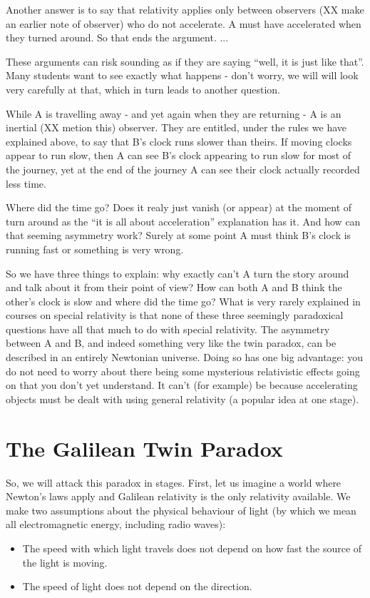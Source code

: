 \documentclass[a4paper]{report}
\begin{document}
Another answer is to say that relativity applies only between observers (XX make an earlier note of observer) who do not accelerate. A must have accelerated when they turned around. So that ends the argument. ...

These arguments can risk sounding as if they are saying ``well, it is just like that''. Many students want to see exactly what happens - don't worry, we will will look very carefully at that, which in turn leads to another question.

While A is travelling away - and yet again when they are returning - A is an inertial (XX metion this) observer. They are entitled, under the rules we have explained above, to say that B's clock runs slower than theirs. If moving clocks appear to run slow, then A can see B's clock appearing to run slow for most of the journey, yet at the end of the journey A can see their clock actually recorded less time.

Where did the time go? Does it realy just vanish (or appear) at the moment of turn around as the ``it is all about acceleration'' explanation has it.  And how can that seeming asymmetry work? Surely at some point A must think B's clock is running fast or something is very wrong.

So we have three things to explain: why exactly can't A turn the story around and talk about it from their point of view? How can both A and B think the other's clock is slow and where did the time go? What is very rarely explained in courses on special relativity is that none of these three seemingly paradoxical questions have all that much to do with special relativity. The asymmetry between A and B, and indeed something very like the twin paradox, can be described in an entirely Newtonian universe. Doing so has one big advantage: you do not need to worry about there being some mysterious relativistic effects going on that you don't yet understand. It can't (for example) be because accelerating objects must be dealt with using general relativity (a popular idea at one stage).

\section*{The Galilean Twin Paradox}

So, we will attack this paradox in stages. First, let us imagine a world where Newton's laws apply and Galilean relativity is the only relativity available. We make two assumptions about the physical behaviour of light (by which we mean all electromagnetic energy, including radio waves):
\begin{itemize}
\item The speed with which light travels does not depend on how fast the source of the light is moving.
\item The speed of light does not depend on the direction.
\end{itemize}
\end{document}
